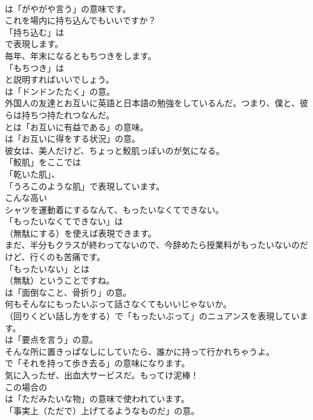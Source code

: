 \documentclass[8pt]{extreport}
\begin{document}
\begin{CJK}{UTF8}{min}
\\	は「がやがや言う」の意味です。	
\\	これを場内に持ち込んでもいいですか？ 
\\	「持ち込む」は
\\	で表現します。	
\\	毎年、年末になるともちつきをします。 
\\	「もちつき」は
\\	と説明すればいいでしょう。
\\	は「ドンドンたたく」の意。	
\\	外国人の友達とお互いに英語と日本語の勉強をしているんだ。つまり、僕と、彼らは持ちつ持たれつなんだ。 
\\	とは「お互いに有益である」の意味。
\\	は「お互いに得をする状況」の意。	
\\	彼女は、美人だけど、ちょっと鮫肌っぽいのが気になる。 
\\	「鮫肌」をここでは
\\	「乾いた肌」、
\\	「うろこのような肌」で表現しています。	
\\	こんな高い
\\	シャツを運動着にするなんて、もったいなくてできない。 
\\	「もったいなくてできない」は 
\\	（無駄にする）を使えば表現できます。	
\\	まだ、半分もクラスが終わってないので、今辞めたら授業料がもったいないのだけど、行くのも苦痛です。 
\\	「もったいない」とは 
\\	（無駄）ということですね。
\\	は「面倒なこと、骨折り」の意。	
\\	何もそんなにもったいぶって話さなくてもいいじゃないか。 
\\	（回りくどい話し方をする）で「もったいぶって」のニュアンスを表現しています。
\\	は「要点を言う」の意。	
\\	そんな所に置きっぱなしにしていたら、誰かに持って行かれちゃうよ。 
\\	で「それを持って歩き去る」の意味になります。	
\\	気に入ったぜ、出血大サービスだ。もってけ泥棒！ 
\\	この場合の
\\	は「ただみたいな物」の意味で使われています。
\\	「事実上（ただで）上げてるようなものだ」の意。	

\end{CJK}
\end{document}
